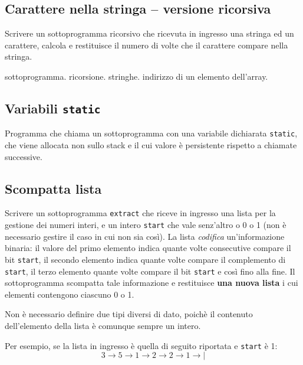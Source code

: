 
\subsection{Carattere nella stringa -- versione ricorsiva}
Scrivere un sottoprogramma ricorsivo che ricevuta in ingresso una stringa ed un carattere, calcola e restituisce il numero di volte che il carattere compare nella stringa.

\begin{tags}
sottoprogramma. ricorsione. stringhe. indirizzo di un elemento dell'array.
\end{tags}


\subsection{Variabili \texttt{static}}
Programma che chiama un sottoprogramma con una variabile dichiarata \texttt{static}, che viene allocata non sullo stack e il cui valore \`e persistente rispetto a chiamate successive.


\subsection{Scompatta lista}
Scrivere un sottoprogramma \texttt{extract} che riceve in ingresso una lista per la gestione dei numeri interi, e un intero \texttt{start} che vale senz'altro o 0 o 1 (non \`e necessario gestire il caso in cui non sia cos\`i). La lista \textit{codifica} un'informazione binaria: il valore del primo elemento indica quante volte consecutive compare il bit \texttt{start}, il secondo elemento indica quante volte compare il complemento di \texttt{start}, il terzo elemento quante volte compare il bit  \texttt{start} e cos\`i fino alla fine.
Il sottoprogramma scompatta tale informazione e restituisce \textbf{una nuova lista} i cui elementi contengono ciascuno 0 o 1. 

Non \`e necessario definire due tipi diversi di dato, poich\`e il contenuto dell'elemento della lista \`e comunque sempre un intero. 

Per esempio, se la lista in ingresso \`e quella di seguito riportata e \texttt{start} \`e 1:
$$
3 \rightarrow 5 \rightarrow 1 \rightarrow 2  \rightarrow 2 \rightarrow 1 \rightarrow|
$$ 

